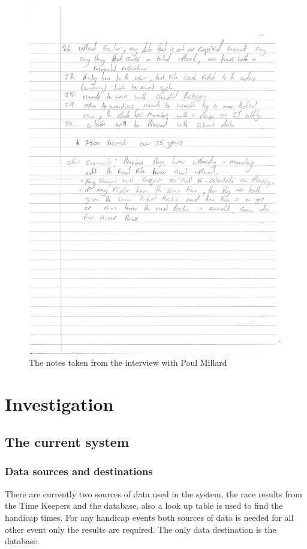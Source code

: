 \begin{figure}[H]
    \includegraphics[width=\textwidth]{./interview/InterviewNotesPage2.pdf}
    \caption{The notes taken from the interview with Paul Millard} \label{fig:Interview notes}
\end{figure}

\section{Investigation}

\subsection{The current system}

\subsubsection{Data sources and destinations}
There are currently two sources of data used in the system, the race results from the Time Keepers and the database, also a look up table is used to find the handicap times. For any handicap events both sources of data is needed for all other event only the results are required. The only data destination is the database.

